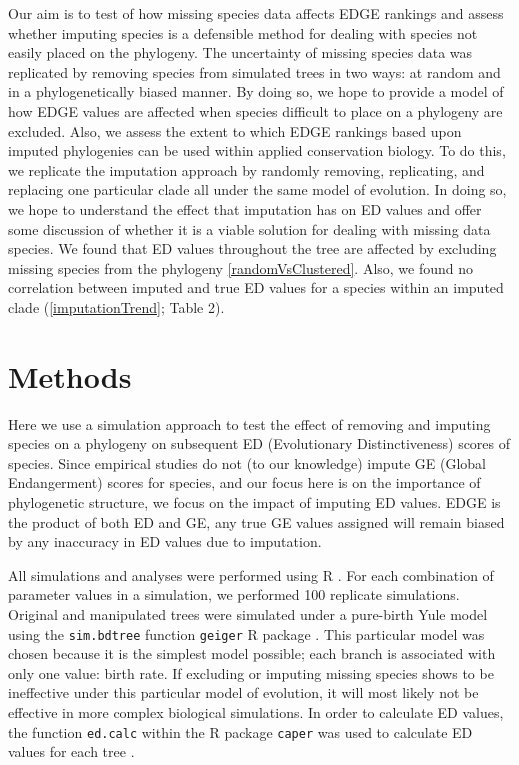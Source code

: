 \documentclass[12pt,english]{article}
\begin{document}
Our aim is to test of how missing species data affects EDGE rankings and assess
whether imputing species is a defensible method for dealing with species not
easily placed on the phylogeny. The uncertainty of missing species data was
replicated by removing species from simulated trees in two ways: at random and
in a phylogenetically biased manner. By doing so, we hope to provide a model of
how EDGE values are affected when species difficult to place on a phylogeny are
excluded. Also, we assess the extent to which EDGE rankings based upon imputed
phylogenies can be used within applied conservation biology. To do this, we
replicate the imputation approach by randomly removing, replicating, and
replacing one particular clade all under the same model of evolution. In doing
so, we hope to understand the effect that imputation has on ED values and offer
some discussion of whether it is a viable solution for dealing with missing data
species. We found that ED values throughout the tree are affected by excluding
missing species from the phylogeny \ref{randomVsClustered}. Also, we found no
correlation between imputed and true ED values for a species within an imputed
clade (\ref{imputationTrend}; Table 2). 

\section*{Methods}
Here we use a simulation approach to test the effect of removing and imputing
species on a phylogeny on subsequent ED (Evolutionary Distinctiveness) scores of
species. Since empirical studies do not (to our knowledge) impute GE (Global
Endangerment) scores for species, and our focus here is on the importance of
phylogenetic structure, we focus on the impact of imputing ED values. EDGE is
the product of both ED and GE, any true GE values assigned will remain biased by
any inaccuracy in ED values due to imputation.

All simulations and analyses were performed using R \autocite[version
3.4.0;][]{R2017}. For each combination of parameter values in a simulation, we
performed 100 replicate simulations. Original and manipulated trees were
simulated under a pure-birth Yule model using the \texttt{sim.bdtree} function
\texttt{geiger} R package \autocite{Harmon2007}. This particular model was
chosen because it is the simplest model possible; each branch is associated with
only one value: birth rate. If excluding or imputing missing species shows to be
ineffective under this particular model of evolution, it will most likely not be
effective in more complex biological simulations. In order to calculate ED
values, the function \texttt{ed.calc} within the R package \texttt{caper} was
used to calculate ED values for each tree \autocite{Orme2013}.
\end{document}
